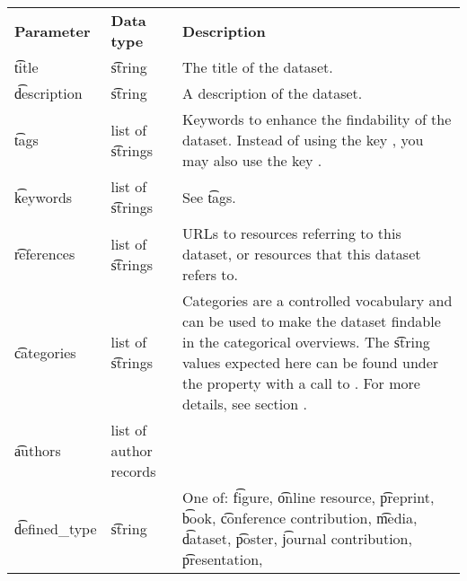 \begin{tabularx}{\textwidth}{*{2}{!{\VRule[-1pt]}l}!{\VRule[-1pt]}X}
  \headrow
  \textbf{Parameter} & \textbf{Data type}   & \textbf{Description}\\
  \t{title}          & \t{string}           & The title of the dataset.\\
  \t{description}    & \t{string}           & A description of the dataset.\\
  \t{tags}           & list of \t{string}s  & Keywords to enhance the
                                              findability of the dataset. Instead
                                              of using the key , you
                                              may also use the key
                                              .\\
  \t{keywords}       & list of \t{string}s  & See \t{tags}.\\
  \t{references}     & list of \t{string}s  & URLs to resources referring to
                                              this dataset, or resources that
                                              this dataset refers to.\\
  \t{categories}     & list of \t{string}s  & Categories are a controlled
                                              vocabulary and can be used to
                                              make the dataset findable in
                                              the categorical overviews.
                                              The \t{string} values expected
                                              here can be found under the
                                               property with a
                                              call to .
                                              For more details, see section
                                              .\\
  \t{authors}        & list of author records & \\
  \t{defined\_type}  & \t{string}           & One of: \t{figure},
                                              \t{online resource},
                                              \t{preprint}, \t{book},
                                              \t{conference contribution},
                                              \t{media}, \t{dataset},
                                              \t{poster},
                                              \t{journal contribution},
                                              \t{presentation},

\end{tabularx}
